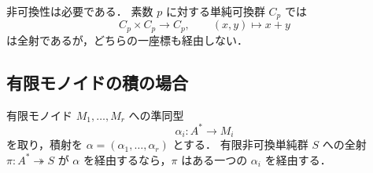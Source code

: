 \begin{remark}
非可換性は必要である．
素数 $p$ に対する単純可換群 $C_p$ では
\[
C_p\times C_p\to C_p,
\qquad
(x,y)\mapsto x+y
\]
は全射であるが，どちらの一座標も経由しない．
\end{remark}

\subsection{有限モノイドの積の場合}

\begin{lemma}[有限モノイド版の一座標補題]\label{lem:monoid-coordinate}
有限モノイド $M_1,\dots,M_r$ への準同型
\[
\alpha_i:A^*\to M_i
\]
を取り，積射を $\alpha=(\alpha_1,\dots,\alpha_r)$ とする．
有限非可換単純群 $S$ への全射 $\pi:A^*\twoheadrightarrow S$ が $\alpha$ を経由するなら，$\pi$ はある一つの $\alpha_i$ を経由する．
\end{lemma}

